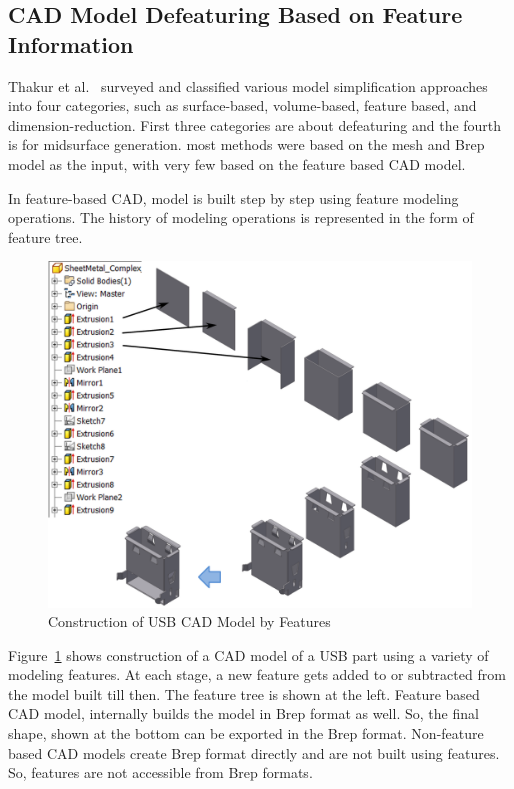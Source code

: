 
\subsection{CAD Model Defeaturing Based on Feature Information}

Thakur et al.~\cite{Thakur2009} surveyed and classified various model simplification approaches into four categories, such as surface-based, volume-based, feature based, and dimension-reduction. First three categories are about defeaturing and the fourth is for midsurface generation.  most methods were based on the mesh and Brep model as the input, with very few based on the feature based CAD model. 

In feature-based CAD, model is built step by step using feature modeling operations. The history of modeling operations is represented in the form of feature tree.


	\begin{figure} [!h]
		\centering
		\includegraphics[width=0.75\linewidth]{images/usbfeaturetree_arrow.pdf}
		\caption{Construction of USB CAD Model by Features}
		\label{fig:introduction:usbtree}
	\end{figure} 


Figure~\ref{fig:introduction:usbtree} shows construction of a CAD model of a USB part using a variety of modeling features. At each stage, a new feature gets added to or subtracted from the model built till then. The feature tree is shown at the left. Feature based CAD model, internally builds the model in Brep format as well. So, the final shape, shown at the bottom can be exported in the Brep format. Non-feature based CAD models create Brep format directly and are not built using features. So, features are not accessible from Brep formats.

